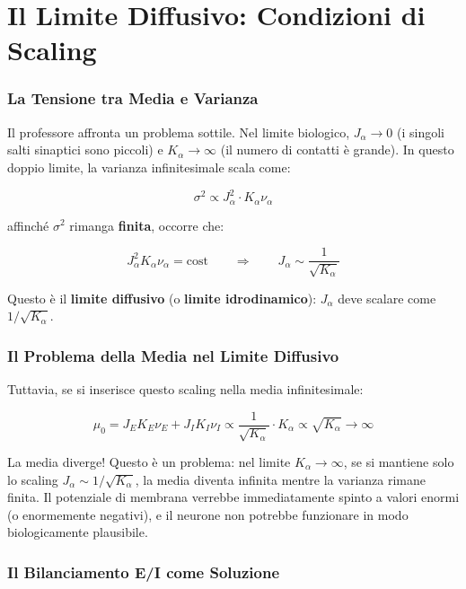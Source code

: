 \section{Il Limite Diffusivo: Condizioni di Scaling}

\subsubsection{La Tensione tra Media e Varianza}

Il professore affronta un problema sottile. Nel limite biologico, $J_\alpha \to 0$ (i singoli salti sinaptici sono piccoli) e $K_\alpha \to \infty$ (il numero di contatti è grande). In questo doppio limite, la varianza infinitesimale scala come:

\begin{equation}
\sigma^2 \propto J_\alpha^2 \cdot K_\alpha \nu_\alpha
\end{equation}

affinché $\sigma^2$ rimanga \textbf{finita}, occorre che:

\begin{equation}
J_\alpha^2 K_\alpha \nu_\alpha = \text{cost} \qquad \Rightarrow \qquad J_\alpha \sim \frac{1}{\sqrt{K_\alpha}}
\end{equation}

Questo è il \textbf{limite diffusivo} (o \textbf{limite idrodinamico}): $J_\alpha$ deve scalare come $1/\sqrt{K_\alpha}$.

\subsubsection{Il Problema della Media nel Limite Diffusivo}

Tuttavia, se si inserisce questo scaling nella media infinitesimale:

\begin{equation}
\mu_0 = J_E K_E \nu_E + J_I K_I \nu_I \propto \frac{1}{\sqrt{K_\alpha}} \cdot K_\alpha \propto \sqrt{K_\alpha} \to \infty
\end{equation}

La media diverge! Questo è un problema: nel limite $K_\alpha \to \infty$, se si mantiene solo lo scaling $J_\alpha \sim 1/\sqrt{K_\alpha}$, la media diventa infinita mentre la varianza rimane finita. Il potenziale di membrana verrebbe immediatamente spinto a valori enormi (o enormemente negativi), e il neurone non potrebbe funzionare in modo biologicamente plausibile.

\subsubsection{Il Bilanciamento E/I come Soluzione}

